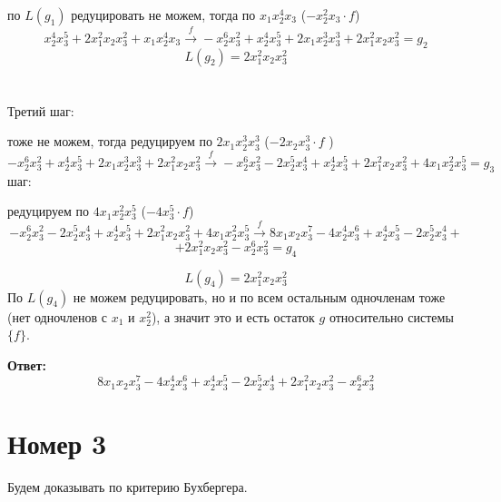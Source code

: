 \documentclass[a4paper,12pt]{article}
\begin{document}
по $L(g_1)$ редуцировать не можем, тогда по $x_1x_2^4x_3$ ($-x_2^2x_3 \cdot f$)
\[
x_2^4x_3^5 + 2x_1^2x_2x_3^2 + x_1x_2^4x_3 \overset{f}{\rightarrow} -x_2^6x_3^2 + x_2^4x_3^5  + 2x_1x_2^3x_3^3 + 2x_1^2x_2x_3^2 = g_2
\]
\[
L(g_2) = 2x_1^2x_2x_3^2
\]
\\\\
Третий шаг:

тоже не можем, тогда редуцируем по $2x_1x_2^3x_3^3$ ($-2x_2x_3^3 \cdot f$ )
\[
-x_2^6x_3^2 + x_2^4x_3^5  + 2x_1x_2^3x_3^3 + 2x_1^2x_2x_3^2  \overset{f}{\rightarrow} -x_2^6x_3^2 - 2x_2^5x_3^4 + x_2^4x_3^5+ 2x_1^2x_2x_3^2 + 4x_1x_2^2x_3^5 = g_3
\]
\clearpage
{} шаг:

редуцируем по $4x_1x_2^2x_3^5$ ($-4x_3^5 \cdot f$)
\[
-x_2^6x_3^2 - 2x_2^5x_3^4 + x_2^4x_3^5+ 2x_1^2x_2x_3^2 + 4x_1x_2^2x_3^5 
\overset{f}{\rightarrow}
8x_1x_2x_3^7 - 4x_2^4x_3^6 + x_2^4x_3^5 - 2x_2^5x_3^4 +
\]
\[
+ 2x_1^2x_2x_3^2 - x_2^6x_3^2 = g_4
\]

\[
L(g_4) = 2x_1^2x_2x_3^2 
\]
По $L(g_4)$ не можем редуцировать, но и по всем остальным одночленам тоже (нет одночленов с $x_1$ и $x_2^2$), а значит это и есть остаток $g$ относительно системы $\{f\}$.
\begin{center}
\textbf{Ответ: } 
\[
8x_1x_2x_3^7 - 4x_2^4x_3^6 + x_2^4x_3^5 - 2x_2^5x_3^4 + 2x_1^2x_2x_3^2 - x_2^6x_3^2
\]
\end{center}
\clearpage
\section*{Номер 3}
\begin{center}
Будем доказывать по критерию Бухбергера.
\end{center}
\end{document}
